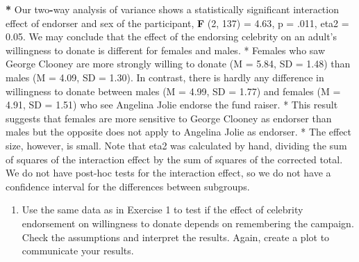 \documentclass[a4paper]{book}
\newenvironment{Shaded}{\begin{snugshade}}{\end{snugshade}}
\newcommand{\KeywordTok}[1]{\textcolor[rgb]{0,0,0}{\textbf{#1}}}
\newcommand{\DecValTok}[1]{\textcolor[rgb]{0.00,0.00,0.00}{#1}}
\newcommand{\FloatTok}[1]{\textcolor[rgb]{0.00,0.00,0.00}{#1}}
\newcommand{\StringTok}[1]{\textcolor[rgb]{0.00,0.00,0.00}{#1}}
\newcommand{\OperatorTok}[1]{\textcolor[rgb]{0.00,0.00,0.00}{\textbf{#1}}}
\newcommand{\NormalTok}[1]{#1}
\providecommand{\tightlist}{%
  \setlength{\itemsep}{0pt}\setlength{\parskip}{0pt}}
\theoremstyle{definition}
\theoremstyle{definition}
\theoremstyle{definition}
\theoremstyle{remark}
\begin{document}
\begin{Shaded}
\begin{Highlighting}[]
\OperatorTok{*}\StringTok{ }\NormalTok{Our two}\OperatorTok{-}\NormalTok{way analysis of variance shows a statistically significant  }
\NormalTok{interaction effect of endorser and sex of the participant, }\KeywordTok{F}\NormalTok{ (}\DecValTok{2}\NormalTok{, }\DecValTok{137}\NormalTok{) =}\StringTok{ }\FloatTok{4.63}\NormalTok{, p =}\StringTok{  }
\NormalTok{.}\DecValTok{011}\NormalTok{, eta2 =}\StringTok{ }\FloatTok{0.05}\NormalTok{. We may conclude that the effect of the endorsing celebrity on an  }
\NormalTok{adult}\StringTok{'s willingness to donate is different for females and males.  }
\StringTok{* Females who saw George Clooney are more strongly willing to donate (M =  }
\StringTok{5.84, SD = 1.48) than males (M = 4.09, SD = 1.30). In contrast, there is  }
\StringTok{hardly any difference in willingness to donate between males (M = 4.99, SD =  }
\StringTok{1.77) and females (M = 4.91, SD = 1.51) who see Angelina Jolie endorse the  }
\StringTok{fund raiser.  }
\StringTok{* This result suggests that females are more sensitive to George Clooney as  }
\StringTok{endorser than males but the opposite does not apply to Angelina Jolie as  }
\StringTok{endorser. }
\StringTok{* The effect size, however, is small.}
\StringTok{  }
\StringTok{Note that eta2 was calculated by hand, dividing the sum of squares of the}
\StringTok{interaction effect by the sum of squares of the corrected total. We do not}
\StringTok{have post-hoc tests for the interaction effect, so we do not have a confidence}
\StringTok{interval for the differences between subgroups.}
\end{Highlighting}
\end{Shaded}

\begin{enumerate}
\def\labelenumi{\arabic{enumi}.}
\setcounter{enumi}{1}
\tightlist
\item
  Use the same data as in Exercise 1 to test if the effect of celebrity
  endorsement on willingness to donate depends on remembering the
  campaign. Check the assumptions and interpret the results. Again,
  create a plot to communicate your results.
\end{enumerate}
\end{document}
